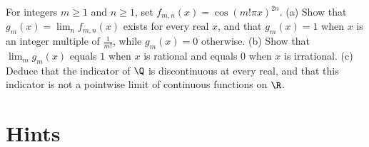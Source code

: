 \begin{exercise}[$\star\star\star$]\label{ex:v7c05d}
For integers $m\ge1$ and $n\ge1$, set $f_{m,n}(x)=\cos(m!\pi x)^{2n}$. (a) Show that $g_m(x)=\lim_n f_{m,n}(x)$ exists for every real $x$, and that $g_m(x)=1$ when $x$ is an integer multiple of $\frac1{m!}$, while $g_m(x)=0$ otherwise. (b) Show that $\lim_m g_m(x)$ equals $1$ when $x$ is rational and equals $0$ when $x$ is irrational. (c) Deduce that the indicator of $\Q$ is discontinuous at every real, and that this indicator is not a pointwise limit of continuous functions on $\R$.
\end{exercise}

\section{Hints}


